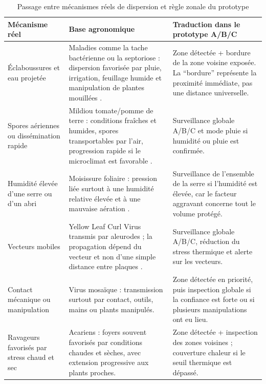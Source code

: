 ﻿\documentclass[11pt,a4paper,openany]{report}
\begin{document}
\begin{table}[H]
\centering
\small
\renewcommand{\arraystretch}{1.3}
\begin{tabular}{|p{3.2cm}|p{4.7cm}|p{6.1cm}|}
\hline
\textbf{Mécanisme réel} &
\textbf{Base agronomique} &
\textbf{Traduction dans le prototype A/B/C} \\
\hline
Éclaboussures et eau projetée &
Maladies comme la tache bactérienne ou la septoriose : dispersion favorisée par pluie, irrigation, feuillage humide et manipulation de plantes mouillées \cite{iowabacterialspot,ncsurbacterialspot,pennstatetomato}. &
Zone détectée + bordure de la zone voisine exposée. La ``bordure'' représente la proximité immédiate, pas une distance universelle. \\
\hline
Spores aériennes ou dissémination rapide &
Mildiou tomate/pomme de terre : conditions fraîches et humides, spores transportables par l'air, progression rapide si le microclimat est favorable \cite{umnlateblight,ndsupotatolate}. &
Surveillance globale A/B/C et mode pluie si humidité ou pluie est confirmée. \\
\hline
Humidité élevée d'une serre ou d'un abri &
Moisissure foliaire : pression liée surtout à une humidité relative élevée et à une mauvaise aération \cite{pennstatetomato}. &
Surveillance de l'ensemble de la serre si l'humidité est élevée, car le facteur aggravant concerne tout le volume protégé. \\
\hline
Vecteurs mobiles &
Yellow Leaf Curl Virus transmis par aleurodes ; la propagation dépend du vecteur et non d'une simple distance entre plaques \cite{nctylcv}. &
Surveillance globale A/B/C, réduction du stress thermique et alerte sur les vecteurs. \\
\hline
Contact mécanique ou manipulation &
Virus mosaïque : transmission surtout par contact, outils, mains ou plants manipulés. &
Zone détectée en priorité, puis inspection globale si la confiance est forte ou si plusieurs manipulations ont eu lieu. \\
\hline
Ravageurs favorisés par stress chaud et sec &
Acariens : foyers souvent favorisés par conditions chaudes et sèches, avec extension progressive aux plants proches. &
Zone détectée + inspection des zones voisines ; couverture chaleur si le seuil thermique est dépassé. \\
\hline
\end{tabular}
\caption{Passage entre mécanismes réels de dispersion et règle zonale du prototype}
\label{tab:mecanismes_propagation_zones}
\end{table}
\end{document}
